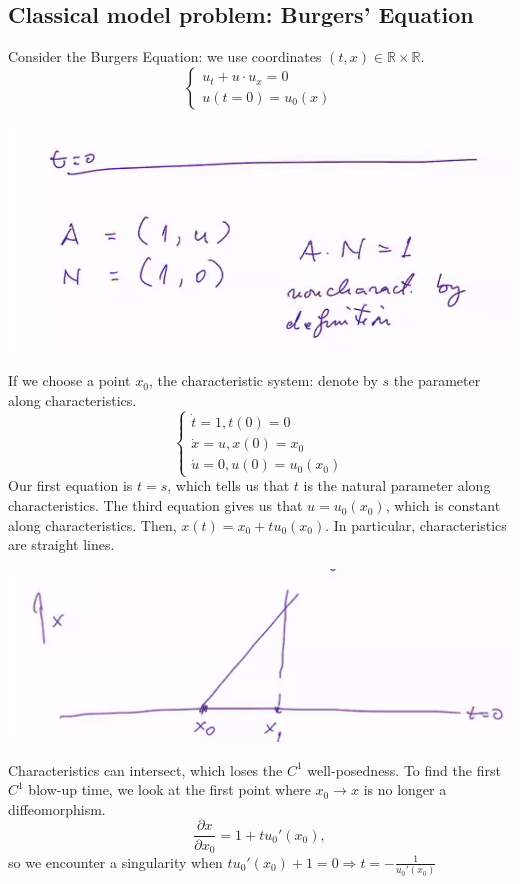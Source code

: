\documentclass[11pt]{scrartcl}
\newcommand{\R}{\mathbb{R}}
\begin{document}
\subsection{Classical model problem: Burgers' Equation}
Consider the Burgers Equation: we use coordinates $(t, x) \in \R \times \R$.
$$\begin{cases}
u_t + u \cdot u_x = 0\\
u(t = 0) = u_0(x)
\end{cases}$$
 \begin{center}
\includegraphics[scale=0.5]{burger.png}
\end{center}
If we choose a point $x_0$, the characteristic system: denote by $s$ the parameter along characteristics.  
$$\begin{cases}
\dot t = 1, t(0) = 0\\
\dot x = u, x(0) = x_0\\
\dot u = 0, u(0) = u_0(x_0)
\end{cases}$$
Our first equation is $t = s$, which tells us that $t$ is the natural parameter along characteristics.  The third equation gives us that $u = u_0(x_0)$, which is constant along characteristics.  Then, $x(t) = x_0 + tu_0(x_0)$.  In particular, characteristics are straight lines.  
 \begin{center}
\includegraphics[scale=0.5]{intersect.png}
\end{center}
Characteristics can intersect, which loses the $C^1$ well-posedness.  To find the first $C^1$ blow-up time, we look at the first point where $x_0 \rightarrow x$ is no longer a diffeomorphism.  
$$\frac{\partial x}{\partial x_0} = 1 + tu_0'(x_0),$$
so we encounter a singularity when $tu_0'(x_0) + 1 = 0 \Rightarrow t = -\frac{1}{u_0'(x_0)}$
\pagebreak
\end{document}
